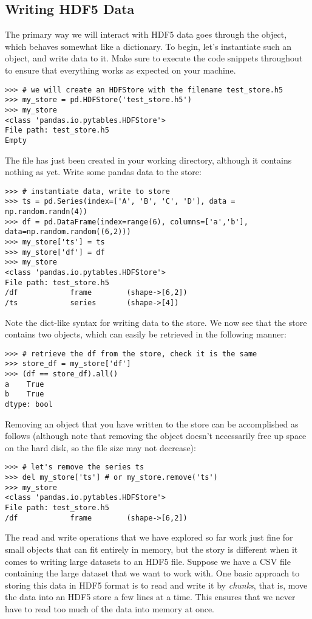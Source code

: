\subsection*{Writing HDF5 Data}
The primary way we will interact with HDF5 data goes through the  object, which behaves somewhat like a dictionary.
To begin, let's instantiate such an object, and write data to it. Make sure to execute the code snippets throughout to ensure that
everything works as expected on your machine.
\begin{lstlisting}
>>> # we will create an HDFStore with the filename test_store.h5
>>> my_store = pd.HDFStore('test_store.h5')
>>> my_store
<class 'pandas.io.pytables.HDFStore'>
File path: test_store.h5
Empty
\end{lstlisting}
The file  has just been created in your working directory, although it contains nothing as yet.
Write some pandas data to the store:
\begin{lstlisting}
>>> # instantiate data, write to store
>>> ts = pd.Series(index=['A', 'B', 'C', 'D'], data = np.random.randn(4))
>>> df = pd.DataFrame(index=range(6), columns=['a','b'], data=np.random.random((6,2)))
>>> my_store['ts'] = ts
>>> my_store['df'] = df
>>> my_store
<class 'pandas.io.pytables.HDFStore'>
File path: test_store.h5
/df            frame        (shape->[6,2])
/ts            series       (shape->[4]) 
\end{lstlisting}
Note the dict-like syntax for writing data to the store. We now see that the store contains two objects, which
can easily be retrieved in the following manner:
\begin{lstlisting}
>>> # retrieve the df from the store, check it is the same
>>> store_df = my_store['df']
>>> (df == store_df).all()
a    True
b    True
dtype: bool
\end{lstlisting}
Removing an object that you have written to the store can be accomplished as follows (although note that removing the
object doesn't necessarily free up space on the hard disk, so the file size may not decrease):
\begin{lstlisting}
>>> # let's remove the series ts
>>> del my_store['ts'] # or my_store.remove('ts')
>>> my_store
<class 'pandas.io.pytables.HDFStore'>
File path: test_store.h5
/df            frame        (shape->[6,2])
\end{lstlisting}

The read and write operations that we have explored so far work just fine for small objects that can fit entirely in memory,
but the story is different when it comes to writing large datasets to an HDF5 file. Suppose we have a CSV file containing the
large dataset that we want to work with. One basic approach to storing this data in HDF5 format is to read and write it by 
\emph{chunks}, that is, move the data into an HDF5 store a few lines at a time. This ensures that we never have to read too much
of the data into memory at once. 

